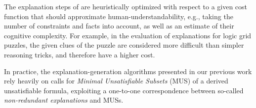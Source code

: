 \documentclass[a4paper,UKenglish,cleveref, autoref, thm-restate, pdfa]{lipics-v2021}
\begin{document}
The explanation steps of \cite{ecai/BogaertsGCG20} are heuristically optimized with respect to a given cost function that should approximate human-understandability, e.g., taking the number of constraints and facts into account, as well as an estimate of their cognitive complexity.
For example, in the evaluation of explanations for logic grid puzzles, the given clues of the puzzle are considered more difficult than simpler reasoning tricks, and therefore have a higher cost.

In practice, the explanation-generation algorithms presented in our previous work rely heavily on calls for \emph{Minimal Unsatisfiable Subsets} (MUS) \cite{marques2010minimal} of a derived unsatisfiable formula, exploiting a one-to-one correspondence between so-called \emph{non-redundant explanations} and MUSs. 
\end{document}
